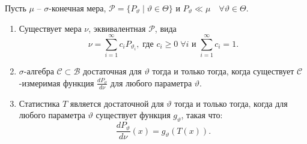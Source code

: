 \begin{thm} \label{Halmos-Savage}
	Пусть $\mu$ -- $\sigma$-конечная мера, $\mathcal{P}=\{P_\vartheta \mid \vartheta \in \Theta \}$ и $P_\vartheta \ll \mu \quad \forall \vartheta \in \Theta $.
	\begin{enumerate}
		\item Существует мера $\nu$, эквивалентная $\mathcal{P}$, вида
		\begin{equation} \label{eq4.1}
		\nu = \sum_{i=1}^{\infty}c_iP_{\vartheta_i},\; \text{где } c_i \geq 0 \; \forall i \text{ и } \sum_{i=1}^{\infty}c_i=1.
		\end{equation}
		\item $\sigma$-алгебра $\mathcal{C} \subset \mathcal{B}$ достаточная для $\vartheta$ тогда и только тогда, когда существует $\mathcal{C}$-измеримая функция $\frac{dP_\vartheta}{d\nu}$ для любого параметра $\vartheta$.
		\item Статистика $T$ является достаточной для $\vartheta$ тогда и только тогда, когда для любого параметра $\vartheta$ существует  функция $g_\vartheta$, такая что:
		\[ \frac{dP_\vartheta}{d\nu}(x)=g_\vartheta(T(x)). \]
	\end{enumerate}
\end{thm}
